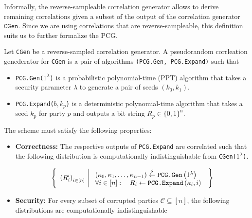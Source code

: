 Informally, the reverse-sampleable correlation generator allows to derive remaining correlations given a subset of the output of the correlation generator $\texttt{CGen}$. Since we are using correlations that are reverse-sampleable, this definition suits us to further formalize the PCG.

\begin{definition}
\label{def:PCGprelim}
Let \texttt{\textup{CGen}} be a reverse-sampled correlation generator. A pseudorandom corrleation genederator for \texttt{\textup{CGen}} is a pair of algorithms \texttt{\textup{(PCG.Gen, PCG.Expand)}} such that
    \begin{itemize}
        \item \texttt{\textup{PCG.Gen($1^\lambda$)}} is a probabilistic polynomial-time (PPT) algorithm that takes a security parameter $\lambda$ to generate a pair of seeds $(k_0, k_1)$.
        \item \texttt{\textup{PCG.Expand($b, k_p$)}} is a deterministic polynomial-time algorithm that takes a seed $k_p$ for party $p$ and outputs a bit string $R_p \in \{0,1\}^n$.
    \end{itemize}
    
    The scheme must satisfy the following properties:
    \begin{itemize}
        \item \textbf{\textup{\textbf{Correctness:}}} The respective outputs of  \texttt{\textup{PCG.Expand}} are correlated such that the following distribution is computationally indistinguishable from \texttt{\textup{CGen($1^\lambda$)}}.
        
        $$
        \left\{\begin{array}{l|l}
        \left(R_i^{\prime}\right)_{i \in[n]} & \begin{array}{l}
        \left(\kappa_0, \kappa_1, \ldots, \kappa_{n-1}\right) \stackrel{\$}{\leftarrow} \texttt{\textup{PCG.Gen}}\left(1^\lambda\right) \\
        \forall i \in[n]: \quad R_i \leftarrow \texttt{\textup{PCG.Expand}}\left(\kappa_i, i\right)
        \end{array}
        \end{array}\right\}
        $$
        
        \item \textbf{\textup{\textbf{Security:}}} For every subset of corrupted parties $\mathcal{C} \subseteq [n]$, the following distributions are computationally indistinguishable


\end{itemize}
\end{definition}
